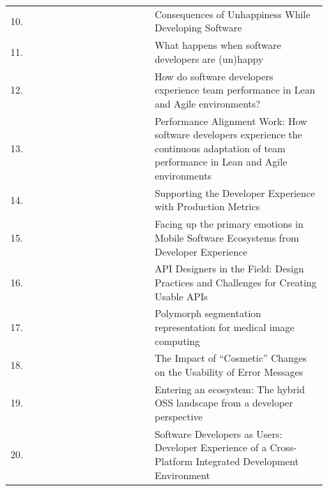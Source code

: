 \documentclass[english, 12pt, a4paper, sci, utf8, a-1b, online]{aaltothesis}
\begin{document}
\begin{center}
\begin{longtable}{p{0.05\linewidth}p{0.35\linewidth}p{0.5\linewidth}}
    10. & \textcite{consequences-of-unhappiness}                & Consequences of Unhappiness While Developing Software                                                                                       \\
    11. & \textcite{what-happens-when-unhappy}                  & What happens when software developers are (un)happy                                                                                         \\
    12. & \textcite{how-developers-experience-team-performance} & How do software developers experience team performance in Lean and Agile environments?                                                      \\
    13. & \textcite{paw}                                        & Performance Alignment Work: How software developers experience the continuous adaptation of team performance in Lean and Agile environments \\
    14. & \textcite{chatley2019supporting}                      & Supporting the Developer Experience with Production Metrics                                                                                 \\
    15. & \textcite{fontao2017facing}                           & Facing up the primary emotions in Mobile Software Ecosystems from Developer Experience                                                      \\
    16. & \textcite{api-designers}                              & API Designers in the Field: Design Practices and Challenges for Creating Usable APIs                                                        \\
    17. & \textcite{pinter2019polymorph}                        & Polymorph segmentation representation for medical image computing                                                                           \\
    18. & \textcite{dong2019impact}                             & The Impact of ``Cosmetic'' Changes on the Usability of Error Messages                                                                       \\
    19. & \textcite{entering-an-ecosystem}                      & Entering an ecosystem: The hybrid OSS landscape from a developer perspective                                                                \\
    20. & \textcite{software-developers-as-users}               & Software Developers as Users: Developer Experience of a Cross-Platform Integrated Development Environment                                   \\

\end{longtable}
\end{center}
\end{document}
